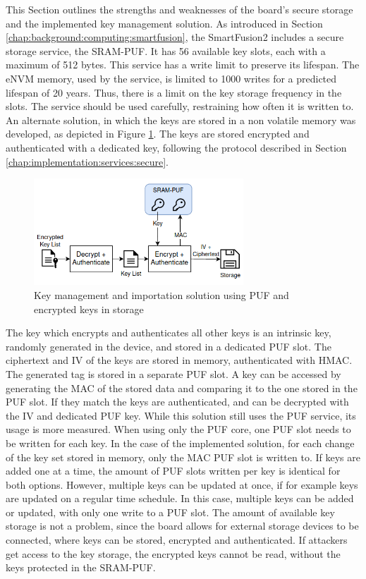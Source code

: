 This Section outlines the strengths and weaknesses of the board's secure storage and the implemented key management solution. 
As introduced in Section \ref{chap:background:computing:smartfusion}, the SmartFusion2 includes a secure storage service, the SRAM-PUF. It has 56 available key slots, each with a maximum of 512 bytes. This service has a write limit to preserve its lifespan. The eNVM memory, used by the service, is limited to 1000 writes for a predicted lifespan of 20 years. Thus, there is a limit on the key storage frequency in the slots. The service should be used carefully, restraining how often it is written to.
An alternate solution, in which the keys are stored in a non volatile memory was developed, as depicted in Figure \ref{fig:implementation:key-management}. The keys are stored encrypted and authenticated with a dedicated key, following the protocol described in Section \ref{chap:implementation:services:secure}.
\begin{figure}[h!]
	\centering
	\includegraphics[width=0.7\textwidth]{./Images/key-management.png}
	\caption{Key management and importation solution using PUF and encrypted keys in storage}
	\label{fig:implementation:key-management}
\end{figure}
The key which encrypts and authenticates all other keys is an intrinsic key, randomly generated in the device, and stored in a dedicated PUF slot. The ciphertext and IV of the keys are stored in memory, authenticated with HMAC. The generated tag is stored in a separate PUF slot.
A key can be accessed by generating the MAC of the stored data and comparing it to the one stored in the PUF slot. If they match the keys are authenticated, and can be decrypted with the IV and dedicated PUF key.
While this solution still uses the PUF service, its usage is more measured. When using only the PUF core, one PUF slot needs to be written for each key. In the case of the implemented solution, for each change of the key set stored in memory, only the MAC PUF slot is written to. If keys are added one at a time, the amount of PUF slots written per key is identical for both options. However, multiple keys can be updated at once, if for example keys are updated on a regular time schedule. In this case, multiple keys can be added or updated, with only one write to a PUF slot. The amount of available key storage is not a problem, since the board allows for external storage devices to be connected, where keys can be stored, encrypted and authenticated. If attackers get access to the key storage, the encrypted keys cannot be read, without the keys protected in the SRAM-PUF.
